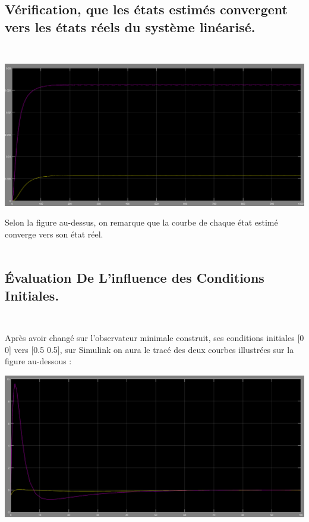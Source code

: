  \subsection{Vérification, que les états estimés convergent vers les états réels du système linéarisé.\\\\} 
 
\begin{center}
\includegraphics[scale=0.4]{Y1.PNG}
\label{fig3} 
\end{center}
 
 Selon la figure au-dessus, on remarque que la courbe de chaque état estimé converge vers son état réel.\\\\  
 
 \subsection{Évaluation De  L’influence des Conditions Initiales.\\\\}

Après avoir changé sur l'observateur minimale construit, ses conditions initiales [0 0] vers [0.5 0.5], sur Simulink on aura le tracé des deux courbes illustrées sur la figure au-dessous :\\    

\begin{center}
\includegraphics[scale=0.4]{Y1_condi_init.PNG}
\label{fig3} 
\end{center}

